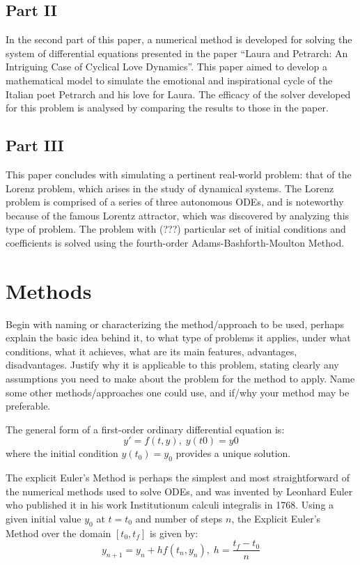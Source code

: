 \documentclass[11pt]{article}
\begin{document}
\subsection{Part II}\label{S:2.2}
%
In the second part of this paper, a numerical method is developed for solving the
system of differential equations presented in the paper “Laura and Petrarch: An 
Intriguing Case of Cyclical Love Dynamics”. This paper aimed to develop a mathematical
model to simulate the emotional and inspirational cycle of the Italian poet Petrarch
and his love for Laura. The efficacy of the solver developed for this problem is
analysed by comparing the results to those in the paper.
\subsection{Part III}\label{S:2.3}
%
This paper concludes with simulating a pertinent real-world problem: that of the 
Lorenz problem, which arises in the study of dynamical systems. The Lorenz problem
is comprised of a series of three autonomous ODEs, and is noteworthy because of
the famous Lorentz attractor, which was discovered by analyzing this type of 
problem. The problem with (???) particular set of initial conditions and coefficients
is solved using the fourth-order Adams-Bashforth-Moulton Method.
\section{Methods}\label{S:3}
Begin with naming or characterizing the method/approach to be used, perhaps explain
the basic idea behind it, to what type of problems it applies, under what 
conditions, what it achieves, what are its main features, advantages, 
disadvantages. Justify why it is applicable to this problem, stating clearly any 
assumptions you need to make about the problem for the method to apply. Name some 
other methods/approaches one could use, and if/why your method may be preferable.

The general form of a first-order ordinary differential equation is:
$$y'=f(t,y),\; y(t0)=y0$$
where the initial condition $y(t_0)=y_0$ provides a unique solution.

The explicit Euler's Method is perhaps the simplest and most straightforward of
the numerical methods used to solve ODEs, and was invented by Leonhard Euler who 
published it in his work Institutionum calculi integralis in 1768. Using a given
initial value $y_0$ at $t=t_0$ and number of steps $n$, the Explicit Euler's Method over
the domain $[t_0, t_f]$ is given by:
$$y_{n+1} = y_{n}+hf(t_{n}, y_{n}),\; h=\frac{t_f-t_0}{n}$$
\end{document}
